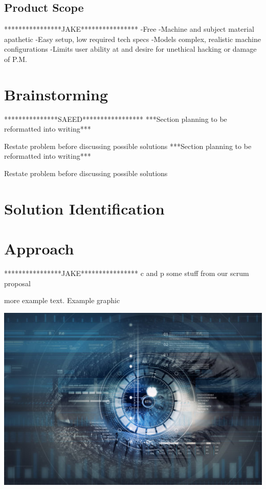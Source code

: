 \documentclass[openright]{report}
\begin{document}
\subsection{Product Scope}
****************JAKE****************
-Free
-Machine and subject material apathetic
-Easy setup, low required tech specs
-Models complex, realistic machine configurations
-Limits user ability at and desire for unethical hacking or damage of P.M.

\section{Brainstorming}

***************SAEED*****************
***Section planning to be reformatted into writing***

Restate problem before discussing possible solutions
    ***Section planning to be reformatted into writing***

Restate problem before discussing possible solutions


\section{Solution Identification}

\section{Approach}
****************JAKE****************
c and p some stuff from our scrum proposal

\par more example text\cite{ibrahiminterview}. Example graphic

\begin{center}
    \includegraphics[scale=1]{images/cyber.jpg}
\end{center}






\listoffigures
\cleardoublepage
\end{document}
